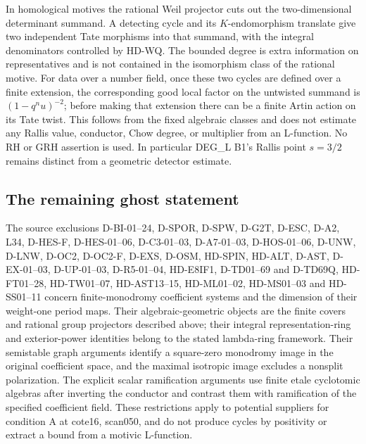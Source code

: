 In homological motives the rational Weil projector cuts out the
two-dimensional determinant summand. A detecting cycle and its
$K$-endomorphism translate give two independent Tate morphisms into
that summand, with the integral denominators controlled by HD-WQ.
The bounded degree is extra information on representatives and is
not contained in the isomorphism class of the rational motive.
For data over a number field, once these two cycles are defined over
a finite extension, the corresponding good local factor on the
untwisted summand is $(1-q^n u)^{-2}$; before making that extension
there can be a finite Artin action on its Tate twist. This follows
from the fixed algebraic classes and does not estimate any Rallis
value, conductor, Chow degree, or multiplier from an L-function.
No RH or GRH assertion is used. In particular DEG\_L B1's Rallis
point $s=3/2$ remains distinct from a geometric detector estimate.

\subsection{The remaining ghost statement}
The source exclusions D-BI-01--24, D-SPOR, D-SPW, D-G2T,
D-ESC, D-A2, L34, D-HES-F, D-HES-01--06, D-C3-01--03, D-A7-01--03, D-HOS-01--06, D-UNW, D-LNW, D-OC2, D-OC2-F, D-EXS, D-OSM, HD-SPIN, HD-ALT, D-AST, D-EX-01--03, D-UP-01--03,
D-R5-01--04, HD-E8IF1, D-TD01--69 and D-TD69Q, HD-FT01--28,
HD-TW01--07, HD-AST13--15, HD-ML01--02, HD-MS01--03 and
HD-SS01--11 concern finite-monodromy coefficient
systems and the dimension of their weight-one period maps. Their
algebraic-geometric objects are the finite covers and rational group
projectors described above; their integral representation-ring and
exterior-power identities belong to the stated lambda-ring framework.
Their semistable graph arguments identify a square-zero monodromy
image in the original coefficient space, and the maximal isotropic
image excludes a nonsplit polarization. The explicit scalar
ramification arguments use finite etale cyclotomic algebras after
inverting the conductor and contrast them with ramification of the
specified coefficient field. These restrictions apply to potential
suppliers for condition A at cote16, scan050, and do not produce
cycles by positivity or extract a bound from a motivic L-function.

